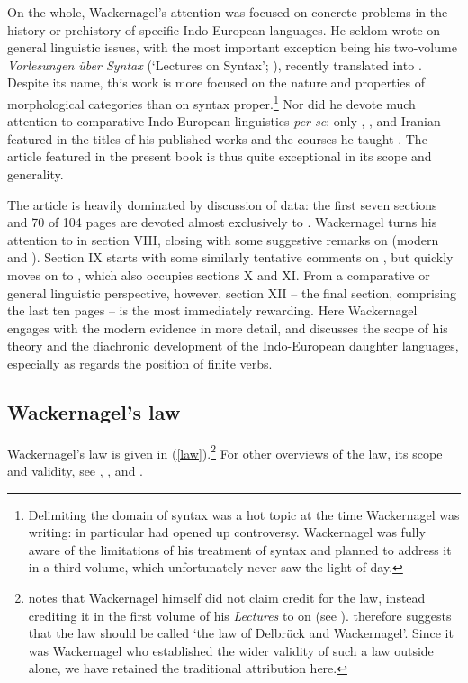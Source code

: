 On the whole, Wackernagel's attention was focused on concrete problems in the history or prehistory of specific Indo-European languages. He seldom wrote on general linguistic issues, with the most important exception being his two-volume \emph{Vorlesungen über Syntax} (`Lectures on Syntax'; \citeyear{Wackernagel1920,Wackernagel1924}), recently translated into  \citep{Langslow2009}. Despite its name, this work is more focused on the nature and properties of morphological categories than on syntax proper.\footnote{Delimiting the domain of syntax was a hot topic at the time Wackernagel was writing: \citet{Ries1894} in particular had opened up controversy. Wackernagel was fully aware of the limitations of his treatment of syntax and planned to address it in a third volume, which unfortunately never saw the light of day.}
Nor did he devote much attention to comparative Indo-European linguistics \emph{per se}: only , ,  and Iranian featured in the titles of his published works and the courses he taught \citep[xi]{Langslow2009}. The article featured in the present book \citep{Wackernagel1892} is thus quite exceptional in its scope and generality.

The article is heavily dominated by discussion of  data: the first seven sections and 70 of 104 pages are devoted almost exclusively to . Wackernagel turns his attention to  in section VIII, closing with some suggestive remarks on  (modern  and ). Section IX starts with some similarly tentative comments on , but quickly moves on to , which also occupies sections X and XI. From a comparative or general linguistic perspective, however, section XII -- the final section, comprising the last ten pages -- is the most immediately rewarding. Here Wackernagel engages with the modern  evidence in more detail, and discusses the scope of his theory and the diachronic development of the Indo-European daughter languages, especially as regards the position of finite verbs.

\subsection{Wackernagel's law}

Wackernagel's law is given in (\ref{law}).\footnote{\citet[218]{Collinge1985} notes that Wackernagel himself did not claim credit for the law, instead crediting it in the first volume of his \textit{Lectures} to \citet{Delbrueck1878} on  (see \citealp[57]{Langslow2009}). \citeauthor{Collinge1985} therefore suggests that the law should be called `the law of Delbrück and Wackernagel'. Since it was Wackernagel who established the wider validity of such a law outside  alone, we have retained the traditional attribution here.} For other overviews of the law, its scope and validity, see \citet[218--219]{Collinge1985}, \citet{Krisch1990}, and \citet{Goldstein2014}.

